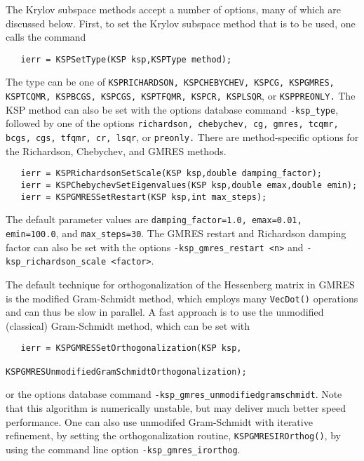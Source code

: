 The Krylov subspace methods accept a number of options, many of which 
are discussed below.  First, to set the Krylov subspace method that is to 
be used, one calls the command 
\begin{verbatim}
   ierr = KSPSetType(KSP ksp,KSPType method);
\end{verbatim}
The type can be one of {\tt KSPRICHARDSON, KSPCHEBYCHEV, KSPCG, KSPGMRES, 
KSPTCQMR, KSPBCGS, KSPCGS, KSPTFQMR, KSPCR, KSPLSQR}, or {\tt KSPPREONLY.}
  
   
 
The KSP method can also be set with the options database command 
{\tt -ksp\_type},
followed by one of the options {\tt richardson, chebychev, cg, gmres, tcqmr, 
bcgs, cgs, tfqmr, cr, lsqr}, or {\tt preonly.} 
There are method-specific options for the Richardson, Chebychev,
and GMRES  
methods.    
\begin{verbatim}
   ierr = KSPRichardsonSetScale(KSP ksp,double damping_factor);
   ierr = KSPChebychevSetEigenvalues(KSP ksp,double emax,double emin);
   ierr = KSPGMRESSetRestart(KSP ksp,int max_steps);
\end{verbatim}
The default parameter values are {\tt damping\_factor=1.0, 
emax=0.01, emin=100.0}, and {\tt max\_steps=30}. The GMRES 
 restart and Richardson damping factor
can also be set with the options {\tt -ksp\_gmres\_restart <n>}
and {\tt -ksp\_richardson\_scale <factor>}.  

The default technique for orthogonalization of the Hessenberg
matrix in GMRES is the modified Gram-Schmidt method, which
employs many {\tt VecDot()} operations and can thus be slow in parallel.
A fast approach is to use the 
unmodified (classical) Gram-Schmidt method, which can be set 
with  
\begin{verbatim}
   ierr = KSPGMRESSetOrthogonalization(KSP ksp,
                               KSPGMRESUnmodifiedGramSchmidtOrthogonalization);
\end{verbatim}
or the options database command {\tt -ksp\_gmres\_unmodifiedgramschmidt}.
Note that this algorithm is numerically unstable, but may deliver 
much better speed performance. One can also use 
unmodifed Gram-Schmidt with iterative refinement, 
 by setting the orthogonalization routine,
{\tt KSPGMRESIROrthog()}, by using the command line option 
{\tt -ksp\_gmres\_irorthog}. 

